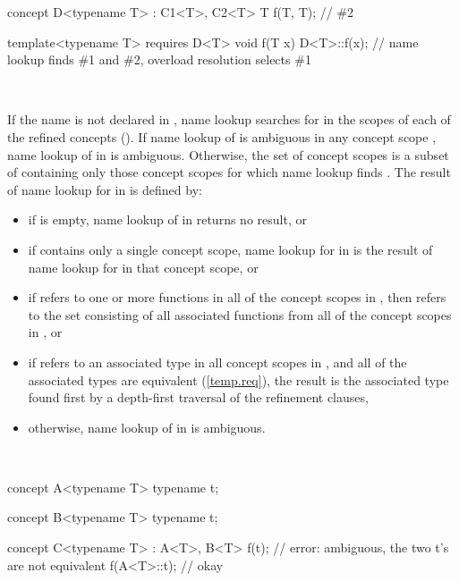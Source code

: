 \documentclass[american]{book}
\begin{document}
\begin{paras}
\begin{codeblock}
concept D<typename T> : C1<T>, C2<T> {
  T f(T, T); // \#2
}

template<typename T> 
requires D<T>
void f(T x) 
{
  D<T>::f(x); // name lookup finds \#1 and \#2, overload resolution selects \#1
}
\end{codeblock}
\exitexample\

\pnum
If the name  is not declared in , name lookup
searches for  in the scopes of each of the refined concepts
(). If name lookup of  is ambiguous in any
concept scope , name lookup of  in  is
ambiguous. Otherwise, the set of concept scopes  is a
subset of  containing only those concept scopes for which
name lookup finds . The result of name lookup for 
in  is defined by:

\begin{itemize}
\item if  is empty, name lookup of  in 
  returns no result, or

\item if  contains only a single concept scope, name
  lookup for  in  is the result of name lookup for
   in that concept scope, or

\item if  refers to one or more
    functions in all of the concept scopes in , then
  refers to the set consisting of
  all associated functions from all of the concept scopes in \mbox{}, or

\item if  refers to an associated type in all concept
  scopes in , and all of the associated types are
  equivalent (\ref{temp.req}), the result is the associated
  type  found first by a depth-first traversal of the
  refinement clauses,

\item otherwise, name lookup of  in  is ambiguous.
\end{itemize}

\enterexample\
\begin{codeblock}
concept A<typename T> { typename t; }

concept B<typename T> { typename t; }

concept C<typename T> :  A<T>, B<T> {
  f(t); // error: ambiguous, the two t's are not equivalent
  f(A<T>::t); // okay
}
\end{codeblock}
\exitexample\


\end{paras}
\end{document}
